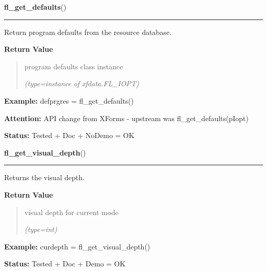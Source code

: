 \hspace{.8\funcindent}\begin{boxedminipage}{\funcwidth}

    \raggedright \textbf{fl\_get\_defaults}()

    \vspace{-1.5ex}

    \rule{\textwidth}{0.5\fboxrule}
\setlength{\parskip}{2ex}
    Return program defaults from the resource database.

\setlength{\parskip}{1ex}
      \textbf{Return Value}
    \vspace{-1ex}

      \begin{quote}
      program defaults class instance

      {\it (type=instance of xfdata.FL\_IOPT)}

      \end{quote}

\textbf{Example:} defprgres = fl\_get\_defaults()



\textbf{Attention:} API change from XForms - upstream was fl\_get\_defaults(pIopt)



\textbf{Status:} Tested + Doc + NoDemo = OK



    \end{boxedminipage}

    \label{xformslib:flxbasic:fl_get_visual_depth}

    \vspace{0.5ex}

\hspace{.8\funcindent}\begin{boxedminipage}{\funcwidth}

    \raggedright \textbf{fl\_get\_visual\_depth}()

    \vspace{-1.5ex}

    \rule{\textwidth}{0.5\fboxrule}
\setlength{\parskip}{2ex}
    Returns the visual depth.

\setlength{\parskip}{1ex}
      \textbf{Return Value}
    \vspace{-1ex}

      \begin{quote}
      visual depth for current mode

      {\it (type=int)}

      \end{quote}

\textbf{Example:} curdepth = fl\_get\_visual\_depth()



\textbf{Status:} Tested + Doc + Demo = OK



    \end{boxedminipage}

